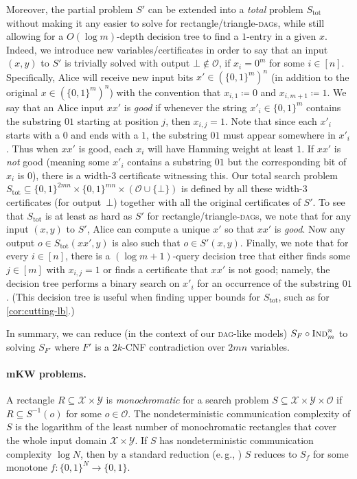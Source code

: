 \documentclass[11pt]{article}
\numberwithin{equation}{section}
\theoremstyle{definition}
\theoremstyle{plain}
\newcommand{\eg}{e.\,g.}
\newcommand{\Ind}{\textsc{Ind}}
\newcommand{\DAG}{\textsc{dag}}
\newcommand{\DAGs}{\textsc{dag}s\xspace}
\newcommand{\calO}{\mathcal{O}}
\newcommand{\calX}{\mathcal{X}}
\newcommand{\calY}{\mathcal{Y}}
\begin{document}
Moreover, the partial problem $S'$ can be extended into a \emph{total} problem $S_{\text{tot}}$ without making it any easier to solve for rectangle/triangle-\DAGs, while still allowing for a $O(\log m)$-depth decision tree to find a $1$-entry in a given $x$. Indeed, we introduce new variables/certificates in order to say that an input $(x,y)$ to $S'$ is trivially solved with output $\bot\notin \calO$, if $x_i=0^m$ for some $i\in[n]$. Specifically, Alice will receive new input bits $x'\in(\{0,1\}^m)^n$ (in addition to the original $x\in(\{0,1\}^m)^n$) with the convention that $x_{i,1}\coloneqq 0$ and $x_{i,m+1}\coloneqq 1$. We say that an Alice input $xx'$ is \emph{good} if whenever the string $x'_i\in\{0,1\}^m$ contains the substring $01$ starting at position $j$, then $x_{i,j}=1$. Note that since each $x'_i$ starts with a $0$ and ends with a $1$, the substring $01$ must appear somewhere in $x'_i$. Thus when $xx'$ is good, each $x_i$ will have Hamming weight at least $1$. If $xx'$ is \emph{not} good (meaning some $x'_i$ contains a substring $01$ but the corresponding bit of $x_i$ is $0$), there is a width-$3$ certificate witnessing this. Our total search problem $S_\text{tot}\subseteq \{0,1\}^{2mn}\times \{0,1\}^{mn}\times(\calO\cup\{\bot\})$ is defined by all these width-$3$ certificates (for output~$\bot$) together with all the original certificates of $S'$. To see that $S_{\text{tot}}$ is at least as hard as $S'$ for rectangle/triangle-\DAGs, we note that for any input $(x,y)$ to $S'$, Alice can compute a unique $x'$ so that $xx'$ is \emph{good}. Now any output $o\in S_{\text{tot}}(xx',y)$ is also such that $o\in S'(x,y)$. Finally, we note that for every $i\in[n]$, there is a $(\log m+1)$-query decision tree that either finds some $j\in[m]$ with $x_{i,j}=1$ or finds a certificate that $xx'$ is not good; namely, the decision tree performs a binary search on $x'_i$ for an occurrence of the substring $01$. (This decision tree is useful when finding upper bounds for $S_\text{tot}$, such as for \autoref{cor:cutting-lb}.)

In summary, we can reduce (in the context of our \DAG-like models) $S_F\circ \Ind_m^n$ to solving $S_{F'}$ where $F'$ is a $2k$-CNF contradiction over $2mn$ variables.



\paragraph{mKW problems.}
A rectangle $R \subseteq\calX\times\calY$ is \emph{monochromatic} for a search problem $S\subseteq\calX\times\calY\times\calO$ if $R\subseteq S^{-1}(o)$ for some $o\in\calO$. The nondeterministic communication complexity of $S$ is the logarithm of the least number of monochromatic rectangles that cover the whole input domain $\calX\times\calY$. If $S$ has nondeterministic communication complexity $\log N$, then by a standard reduction (\eg, \cite[Lemma 2.3]{gal01characterization}) $S$ reduces to $S_f$ for some monotone $f\colon\{0,1\}^N\to\{0,1\}$.
\end{document}
